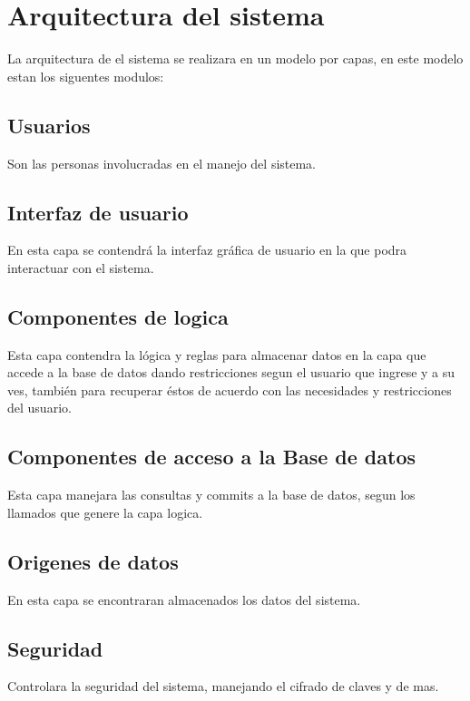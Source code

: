 \documentclass[12pt]{article}
\begin{document}
\section{Arquitectura del sistema}
La arquitectura de el sistema se realizara en un modelo por capas, en este modelo estan los siguentes modulos:\\

\subsection{Usuarios} 
Son las personas involucradas en el manejo del sistema.
\subsection{Interfaz de usuario}
En esta capa se contendr\'a la interfaz gráfica de usuario en la que podra interactuar con el sistema.
\subsection{Componentes de logica}
Esta capa contendra la lógica y reglas para almacenar datos en la capa que accede a la base de datos dando restricciones segun el usuario que ingrese y a su ves, tambi\'en para recuperar éstos de acuerdo con las necesidades y restricciones del usuario.
\subsection{Componentes de acceso a la Base de datos}
Esta capa manejara las consultas y commits a la base de datos, segun los llamados que genere la capa logica.
\subsection{Origenes de datos}
En esta capa se encontraran almacenados los datos del sistema.
\subsection{Seguridad}
Controlara la seguridad del sistema, manejando el cifrado de claves y de mas.
\end{document}
